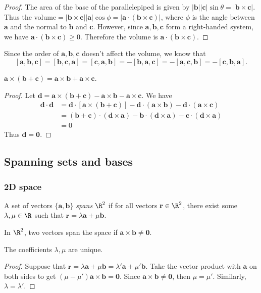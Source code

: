 \documentclass[a4paper]{article}
\begin{document}
\begin{proof}
  The area of the base of the parallelepiped is given by $\mathbf{|b||c|}\sin\theta = \mathbf{|b\times c|}$. Thus the volume$ = \mathbf{|b\times c||a|}\cos\phi = \mathbf{|a\cdot(b\times c)|}$, where $\phi$ is the angle between $\mathbf{a}$ and the normal to $\mathbf{b}$ and $\mathbf{c}$. However, since $\mathbf{a, b, c}$ form a right-handed system, we have $\mathbf{a\cdot (b\times c)} \geq 0$. Therefore the volume is $\mathbf{a\cdot(b\times c)}$.
\end{proof}
Since the order of $\mathbf{a, b, c}$ doesn't affect the volume, we know that
\[
  \mathbf{[a, b, c] = [b, c, a] = [c, a, b] = -[b, a, c] = -[a, c, b] = -[c, b, a]}.
\]

\begin{thm}
  $\mathbf{a\times (b + c) = a\times b + a\times c}$.
\end{thm}
\begin{proof}
  Let $\mathbf{d = a\times (b + c) - a\times b - a\times c}$. We have
  \begin{align*}
    \mathbf{d\cdot d} &= \mathbf{d\cdot[a\times (b + c)] - d\cdot(a\times b) - d\cdot(a\times c)}\\
    &= \mathbf{(b+c)\cdot(d \times a) - b\cdot(d\times a) - c\cdot(d\times a)}\\
    &= 0
  \end{align*}
  Thus $\mathbf{d = 0}$.
\end{proof}

\subsection{Spanning sets and bases}
\subsubsection{2D space}
\begin{defi}
  A set of vectors $\{\mathbf{a, b}\}$ \emph{spans} $\R^2$ if for all vectors $\mathbf{r}\in \R^2$, there exist some $\lambda, \mu\in \R$ such that $\mathbf{r} = \lambda\mathbf{a} + \mu\mathbf{b}$.
\end{defi}

In $\R^2$, two vectors span the space if $\mathbf{a}\times \mathbf{b} \not= \mathbf{0}$.
\begin{thm}
  The coefficients $\lambda, \mu$ are unique.
\end{thm}

\begin{proof}
  Suppose that $\mathbf{r} = \lambda\mathbf{a} + \mu\mathbf{b} = \lambda'\mathbf{a} + \mu'\mathbf{b}$. Take the vector product with $\mathbf{a}$ on both sides to get $(\mu - \mu')\mathbf{a\times b} = \mathbf{0}$. Since $\mathbf{a\times b}\not= \mathbf{0}$, then $\mu=\mu'$. Similarly, $\lambda = \lambda'$.
\end{proof}
\end{document}
